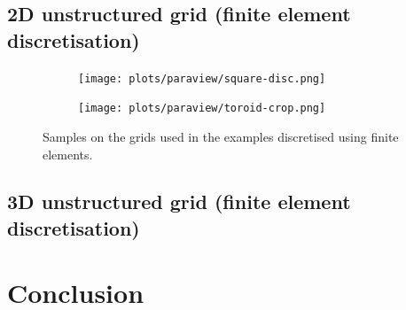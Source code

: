 \documentclass[
fontsize=11pt,
paper=a4,
numbers=noenddot
]{scrartcl}
\begin{document}
\subsection{2D unstructured grid (finite element discretisation)}
\begin{figure}[htbp]
    \centering
    \begin{subfigure}[b]{0.49\textwidth}
        \centering
        \texttt{[image: plots/paraview/square-disc.png]}
    \end{subfigure}
    \hfill
    \begin{subfigure}[b]{0.49\textwidth}
        \centering
        \texttt{[image: plots/paraview/toroid-crop.png]}
      \end{subfigure}
      \caption{Samples on the grids used in the examples discretised using finite elements.}
    \label{fig:2d_structured_ss}
\end{figure}

\subsection{3D unstructured grid (finite element discretisation)}
\label{sec:3dfe}



\section{Conclusion}





\end{document}
